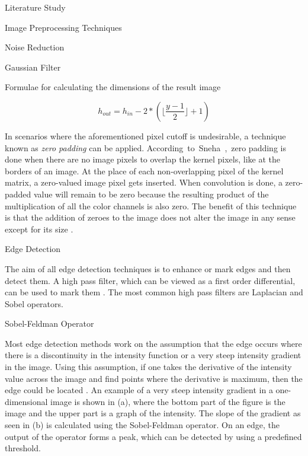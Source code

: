 \documentclass{matthijs}
\begin{document}
\begin{hoofdstuk}{Literature Study}
\begin{paragraaf}{Image Preprocessing Techniques}
\begin{subparagraaf}{Noise Reduction}
\begin{subsubparagraaf}{Gaussian Filter}
\begin{figuur}{Formulae for calculating the dimensions of the result image}
						\vspace{-4ex}
					
						\begin{equation*}
							h_{out} = h_{in} - 2 * (\lfloor\frac{y - 1}{2}\rfloor + 1)
						\end{equation*}
					\end{figuur}

					\bigskip

					In scenarios where the aforementioned pixel cutoff is undesirable, a technique known as \textit{zero padding} can be applied.
					\mbox{According to Sneha \cite{sneha2018convolution}, zero} padding is done when there are no image pixels to overlap the kernel pixels, like at the borders of an image.
					At the place of each non-overlapping pixel of the kernel matrix, a zero-valued image pixel gets inserted.
					When convolution is done, a zero-padded value will remain to be zero because the resulting product of the multiplication of all the color channels is also zero.
					The benefit of this technique is that the addition of zeroes to the image does not alter the image in any sense except for its size \cite{sneha2018convolution}.

				\end{subsubparagraaf}

			\end{subparagraaf}

			\begin{subparagraaf}{Edge Detection}

				The aim of all edge detection techniques is to enhance or mark edges and then detect them.
				A high pass filter, which can be viewed as a first order differential, can be used to mark them \cite{hossack2006edge}.
				The most common high pass filters are Laplacian and Sobel operators.

				\begin{subsubparagraaf}{Sobel-Feldman Operator}

					Most edge detection methods work on the assumption that the edge occurs where there is a discontinuity in the intensity function or a very steep intensity gradient in the image.
					Using this assumption, if one takes the derivative of the intensity value across the image and find points where the derivative is maximum, then the edge could be located \cite{vincent2009descriptive}.
					An example of a very steep intensity gradient in a one-dimensional image is shown in (a), where the bottom part of the figure is the image and the upper part is a graph of the intensity.
					The slope of the gradient as seen in (b) is calculated using the Sobel-Feldman operator.
					On an edge, the output of the operator forms a peak, which can be detected by using a predefined threshold.


\end{subsubparagraaf}
\end{subparagraaf}
\end{paragraaf}
\end{hoofdstuk}
\end{document}

